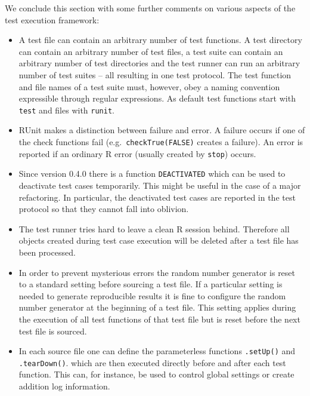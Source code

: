 \documentclass[12pt, a4paper]{article}
\begin{document}
 We conclude this section with some further comments on various aspects of the test execution framework:
\begin{itemize}
\item{A test file can contain an arbitrary number of test functions. A test directory can contain an arbitrary number of test files, a test suite can contain an arbitrary number of test directories and the test runner can run an arbitrary number of test suites -- all resulting in one test protocol. The test function and file names of a test suite must, however,  obey a naming convention expressible through regular expressions.
    As default test functions start with {\tt test} and files with {\tt runit}.}
\item{RUnit makes a distinction between failure and error. A failure occurs if one of the check functions fail (e.g.~{\tt checkTrue(FALSE)} creates a failure). An error is reported if an ordinary R error (usually created by {\tt stop}) occurs.}
\item{Since version 0.4.0 there is a function {\tt DEACTIVATED} which
can be used to deactivate test cases temporarily. This might be useful
in the case of a major refactoring. In particular, the deactivated
test cases are reported in the test protocol so that they cannot fall
into oblivion.}
\item{The test runner tries hard to leave a clean R session behind. Therefore all objects created during test case execution will be deleted after a test file has been processed.}
\item{In order to prevent mysterious errors the random number generator is reset to a standard setting before sourcing a test file. If a particular setting is needed to generate reproducible results it is fine to configure the random number generator at the beginning of a test file. This setting applies during the execution of all test functions of that test file but is reset before the next test file is sourced.}
\item{In each source file one can define the parameterless functions {\tt .setUp()} and {\tt .tearDown()}.
which are then executed directly before and after each test function. This can, for instance, be used to control global settings or create addition log information.}

\end{itemize}
\end{document}
